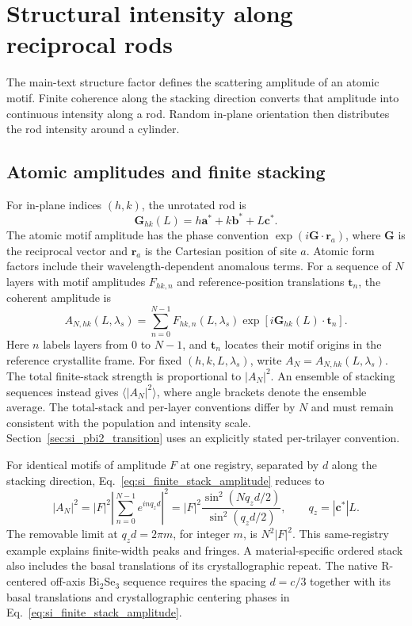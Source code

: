 \section{Structural intensity along reciprocal rods}
\label{sec:si_structure_factor_conventions}

The main-text structure factor defines the scattering amplitude of an atomic motif. Finite coherence along the stacking direction converts that amplitude into continuous intensity along a rod. Random in-plane orientation then distributes the rod intensity around a cylinder.

\subsection{Atomic amplitudes and finite stacking}

For in-plane indices $(h,k)$, the unrotated rod is
\begin{equation}
\mathbf G_{hk}(L)=h\mathbf a^*+k\mathbf b^*+L\mathbf c^*.
\label{eq:si_reference_rod}
\end{equation}
The atomic motif amplitude has the phase convention $\exp(i\mathbf G\cdot\mathbf r_a)$, where $\mathbf G$ is the reciprocal vector and $\mathbf r_a$ is the Cartesian position of site $a$. Atomic form factors include their wavelength-dependent anomalous terms. For a sequence of $N$ layers with motif amplitudes $F_{hk,n}$ and reference-position translations $\mathbf t_n$, the coherent amplitude is
\begin{equation}
A_{N,hk}(L,\lambda_s)=\sum_{n=0}^{N-1}F_{hk,n}(L,\lambda_s)
\exp[i\mathbf G_{hk}(L)\cdot\mathbf t_n].
\label{eq:si_finite_stack_amplitude}
\end{equation}
Here $n$ labels layers from $0$ to $N-1$, and $\mathbf t_n$ locates their motif origins in the reference crystallite frame. For fixed $(h,k,L,\lambda_s)$, write $A_N=A_{N,hk}(L,\lambda_s)$. The total finite-stack strength is proportional to $|A_N|^2$. An ensemble of stacking sequences instead gives $\langle|A_N|^2\rangle$, where angle brackets denote the ensemble average. The total-stack and per-layer conventions differ by $N$ and must remain consistent with the population and intensity scale. Section~\ref{sec:si_pbi2_transition} uses an explicitly stated per-trilayer convention.

For identical motifs of amplitude $F$ at one registry, separated by $d$ along the stacking direction, Eq.~\eqref{eq:si_finite_stack_amplitude} reduces to
\begin{equation}
|A_N|^2=|F|^2\left|\sum_{n=0}^{N-1}e^{inq_zd}\right|^2
=|F|^2\frac{\sin^2(Nq_zd/2)}{\sin^2(q_zd/2)},
\qquad q_z=|\mathbf c^*|L.
\label{eq:si_same_registry_laue}
\end{equation}
The removable limit at $q_zd=2\pi m$, for integer $m$, is $N^2|F|^2$. This same-registry example explains finite-width peaks and fringes. A material-specific ordered stack also includes the basal translations of its crystallographic repeat. The native R-centered off-axis Bi$_2$Se$_3$ sequence requires the spacing $d=c/3$ together with its basal translations and crystallographic centering phases in Eq.~\eqref{eq:si_finite_stack_amplitude}.

